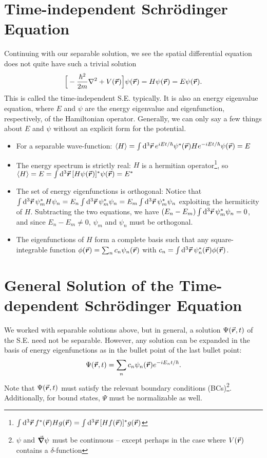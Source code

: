\section{Time-independent Schr\"{o}dinger Equation}


Continuing with our separable solution, we see the spatial differential equation does not quite have such a trivial solution
\begin{eqnarray}
    \Big[ -\frac{\hbar^2}{2m} \laplacian + V(\va*{r}) \Big] \psi(\va*{r}) = H \psi(\va*{r}) = E \psi(\va*{r})
.\end{eqnarray}
This is called the time-independent S.E. typically.
It is also an energy eigenvalue equation, where $E$ and $\psi$ are the energy eigenvalue and eigenfunction, respectively, of the Hamiltonian operator.
Generally, we can only say a few things about $E$ and $\psi$ without an explicit form for the potential.
\begin{itemize}
    \item For a separable wave-function: $\expval{H} = \int \dd[3]{\va*{r}} e^{i E t / \hbar} \psi^{*}(\va*{r}) H e^{-i E t / \hbar} \psi(\va*{r}) = E$
    \item The energy spectrum is strictly real: $H$ is a hermitian operator\footnote{$\int \dd[3]{\va*{r}} f^{*}(\va*{r}) H g(\va*{r}) = \int \dd[3]{\va*{r}} [H f(\va*{r})]^{*} g(\va*{r})$}, so $\expval{H} = E = \int \dd[3]{\va*{r}} [H \psi(\va*{r})]^{*} \psi(\va*{r}) = E^{*}$
    \item The set of energy eigenfunctions is orthogonal: Notice that $\int \dd[3]{\va*{r}} \psi_{m}^{*} H \psi_{n} = E_{n} \int \dd[3]{\va*{r}} \psi_{m}^{*} \psi_{n} = E_{m} \int \dd[3]{\va*{r}} \psi_{m}^{*} \psi_{n}$ exploiting the hermiticity of $H$. Subtracting the two equations, we have $(E_{n} - E_{m}) \int \dd[3]{\va*{r}} \psi_{m}^{*} \psi_{n} = 0$, and since $E_{n} - E_{m} \ne 0$, $\psi_{m}$ and $\psi_{n}$ must be orthogonal.
    \item The eigenfunctions of $H$ form a complete basis such that any square-integrable function $\phi(\va*{r}) = \sum_{n} c_{n} \psi_{n}(\va*{r})$ with $c_{n} = \int \dd[3]{\va*{r}} \psi_{n}^{*}(\va*{r}) \phi(\va*{r})$.
\end{itemize}


\section{General Solution of the Time-dependent Schr\"{o}dinger Equation}

We worked with separable solutions above, but in general, a solution $\Psi(\va*{r},t)$ of the S.E. need not be separable.
However, any solution can be expanded in the basis of energy eigenfunctions as in the bullet point of the last bullet point:
\begin{eqnarray}
    \Psi(\va*{r},t) = \sum_{n} c_{n} \psi_{n}(\va*{r}) e^{- i E_{n} t / \hbar}
.\end{eqnarray}
Note that $\Psi(\va*{r},t)$ must satisfy the relevant boundary conditions (BCs)\footnote{$\psi$ and $\grad \psi$ must be continuous -- except perhaps in the case where $V(\va*{r})$ contains a $\delta$-function}.
Additionally, for bound states, $\Psi$ must be  normalizable as well.


